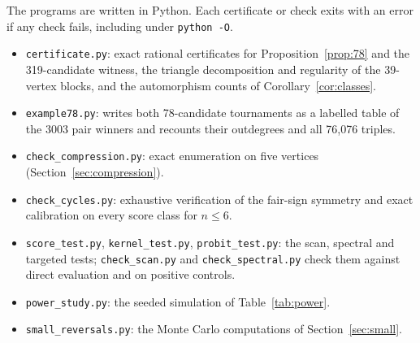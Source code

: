 \documentclass[11pt,a4paper]{article}
\theoremstyle{definition}
\begin{document}
The programs are written in Python. Each certificate or check exits with an error if any check fails, including under \texttt{python -O}.
\begin{itemize}[leftmargin=*]
\item \texttt{certificate.py}: exact rational certificates for Proposition~\ref{prop:78} and the 319-candidate witness, the triangle decomposition and regularity of the 39-vertex blocks, and the automorphism counts of Corollary~\ref{cor:classes}.
\item \texttt{example78.py}: writes both 78-candidate tournaments as a labelled table of the 3003 pair winners and recounts their outdegrees and all 76,076 triples.
\item \texttt{check\_compression.py}: exact enumeration on five vertices (Section~\ref{sec:compression}).
\item \texttt{check\_cycles.py}: exhaustive verification of the fair-sign symmetry and exact calibration on every score class for $n\le6$.
\item \texttt{score\_test.py}, \texttt{kernel\_test.py}, \texttt{probit\_test.py}: the scan, spectral and targeted tests; \texttt{check\_scan.py} and \texttt{check\_spectral.py} check them against direct evaluation and on positive controls.
\item \texttt{power\_study.py}: the seeded simulation of Table~\ref{tab:power}.
\item \texttt{small\_reversals.py}: the Monte Carlo computations of Section~\ref{sec:small}.
\end{itemize}
\end{document}
